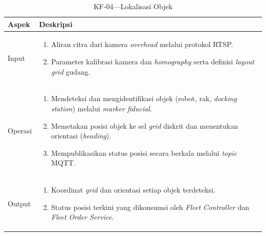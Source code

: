 \begin{xltabular}{\textwidth}{ | l | X | }
  \caption{KF-04---Lokalisasi Objek} \label{tab:kf04} \\
  \hline
  \textbf{Aspek} & \textbf{Deskripsi} \\
  \hline
  \endfirsthead
  \hline
  \endfoot
  Input &
  \begin{enumerate}[leftmargin=*,nosep]
    \item Aliran citra dari kamera \textit{overhead} melalui protokol RTSP.
    \item Parameter kalibrasi kamera dan \textit{homography} serta definisi \textit{layout grid} gudang.
  \end{enumerate} \\
  \hline
  Operasi &
  \begin{enumerate}[leftmargin=*,nosep]
    \item Mendeteksi dan mengidentifikasi objek (robot, rak, \textit{docking station}) melalui \textit{marker fiducial}.
    \item Memetakan posisi objek ke sel \textit{grid} diskrit dan menentukan orientasi (\textit{heading}).
    \item Mempublikasikan status posisi secara berkala melalui \textit{topic} MQTT.
  \end{enumerate} \\
  \hline
  Output &
  \begin{enumerate}[leftmargin=*,nosep]
    \item Koordinat \textit{grid} dan orientasi setiap objek terdeteksi.
    \item Status posisi terkini yang dikonsumsi oleh \textit{Fleet Controller} dan \textit{Fleet Order Service}.
  \end{enumerate} \\
  \hline
\end{xltabular}

